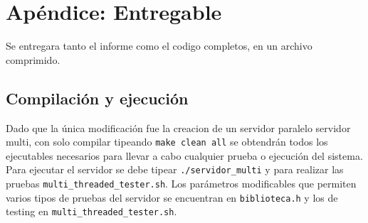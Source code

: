 \section{Ap\'endice: Entregable}
Se entregara tanto el informe como el codigo completos, en un archivo comprimido.
\subsection{Compilaci\'on y ejecuci\'on}
Dado que la \'unica modificaci\'on fue la creacion de un servidor paralelo servidor multi, con solo compilar tipeando \verb|make clean all| se obtendr\'an todos los ejecutables necesarios para llevar a cabo cualquier prueba o ejecuci\'on del sistema. Para ejecutar el servidor se debe tipear \verb|./servidor_multi| y para realizar las pruebas \verb|multi_threaded_tester.sh|. Los par\'ametros modificables que permiten varios tipos de pruebas del servidor se encuentran en \verb|biblioteca.h| y los de testing en \verb|multi_threaded_tester.sh|.
